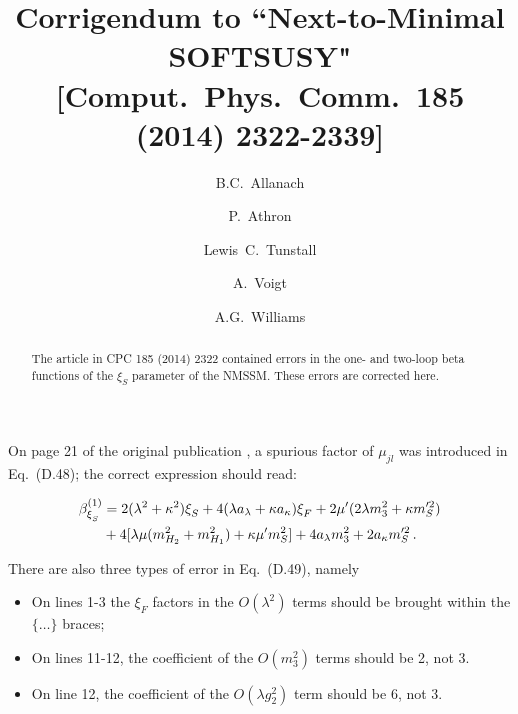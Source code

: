 \documentclass[final,3p,times,pdflatex]{elsarticle}
\newcommand{\lamsq}{\lambda^2}
\newcommand{\kapsq}{\kappa^2}
\newcommand{\mhusq}{m^2_{H_2}}
\newcommand{\mhdsq}{m^2_{H_1}}
\newcommand{\mssq}{m_S^2}
\begin{document}
\begin{frontmatter}

\title{Corrigendum to ``Next-to-Minimal SOFTSUSY" [Comput.\ Phys.\ Comm.\ 185 (2014) 2322-2339]}

\author[damtp]{B.C.~Allanach}
\author[adelaide]{P.~Athron}
\author[adelaide,bern]{Lewis~C.~Tunstall}
\author[dresden]{A.~Voigt}
\author[adelaide]{A.G.~Williams}
\address[damtp]{DAMTP, CMS, University of Cambridge, Wilberforce road, Cambridge, CB3
  0WA, United Kingdom}
\address[adelaide]{ARC Centre of Excellence for Particle Physics at
the Tera-scale, School of Chemistry and Physics, University of Adelaide,
Adelaide SA 5005 Australia}
\address[bern]{Albert Einstein Center for Fundamental Physics, Institute for Theoretical Physics, University of Bern, Sidlerstrasse 5, CH-3012 Bern, Switzerland}
\address[dresden]{Institut f\"ur Kern- und Teilchenphysik,
TU Dresden, Zellescher Weg 19, 01069 Dresden, Germany}

\begin{abstract}
  The article in CPC 185 (2014) 2322 contained errors in the one- and two-loop beta functions of the $\xi_S$ parameter of the NMSSM. These errors are corrected here.
\end{abstract}

\end{frontmatter}

On page 21 of the original publication \cite{nmssm}, a spurious factor of $\mu_{jl}$ was introduced in Eq.\ (D.48); the correct expression should read:

\begin{align}
  \beta_{\xi^{}_S}^{(1)} &= 2(\lamsq + \kapsq)\xi^{}_S + 4(\lambda a_\lambda + \kappa a_\kappa)\xi^{}_F + 2\mu'(2\lambda m_3^2 + \kappa m_S'^2) \notag \\
%
&+ 4[\lambda\mu (\mhusq + \mhdsq) + \kappa\mu' \mssq] + 4a_\lambda m_3^2 + 2a_\kappa m_S'^2\,.
\end{align}

There are also three types of error in Eq.\ (D.49), namely

\begin{itemize}
  \item On lines 1-3 the $\xi_F$ factors in the $O(\lambda^2)$ terms should be brought within the $\{\ldots \}$ braces;
  \item On lines 11-12, the coefficient of the $O(m_3^2)$ terms should be 2, not 3.
  \item On line 12, the coefficient of the $O(\lambda g_2^2)$ term should be 6, not 3.
\end{itemize}
\end{document}
